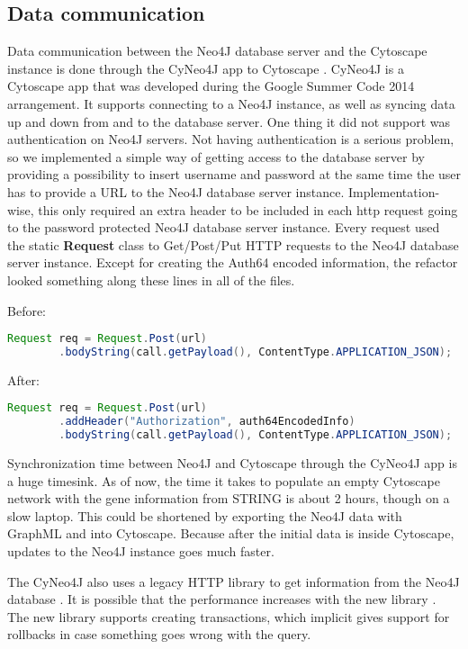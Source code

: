\subsection{Data communication}
Data communication between the Neo4J database server and the Cytoscape instance
is done through the CyNeo4J app to Cytoscape \cite{cyneo4j}. CyNeo4J is a
Cytoscape app that was developed during the Google Summer Code 2014 arrangement.
It supports connecting to a Neo4J instance, as well as syncing data up and down
from and to the database server. One thing it did not support was authentication
on Neo4J servers. Not having authentication is a serious problem, so we
implemented a simple way of getting access to the database server by providing a
possibility to insert username and password at the same time the user has to
provide a URL to the Neo4J database server instance. Implementation-wise, this
only required an extra header to be included in each http request going to the
password protected Neo4J database server instance. Every request used the static
\textbf{Request} class to Get/Post/Put HTTP requests to the Neo4J database
server instance. Except for creating the Auth64 encoded information, the
refactor looked something along these lines in all of the files.

Before:
\begin{lstlisting}[frame=single,language=Java]
Request req = Request.Post(url)
        .bodyString(call.getPayload(), ContentType.APPLICATION_JSON);
\end{lstlisting}

After:
\begin{lstlisting}[frame=single,language=Java]
Request req = Request.Post(url)
        .addHeader("Authorization", auth64EncodedInfo)
        .bodyString(call.getPayload(), ContentType.APPLICATION_JSON);
\end{lstlisting}

Synchronization time between Neo4J and Cytoscape through the CyNeo4J app is a
huge timesink. As of now, the time it takes to populate an empty Cytoscape
network with the gene information from STRING is about 2 hours, though on a slow
laptop. This could be shortened by exporting the Neo4J data with GraphML and
into Cytoscape. Because after the initial data is inside Cytoscape, updates to
the Neo4J instance goes much faster.

The CyNeo4J also uses a legacy HTTP library to get information from the Neo4J
database \cite{legacy-neo4j}. It is possible that the performance increases with
the new library \cite{transactional-neo4j}. The new library supports creating
transactions, which implicit gives support for rollbacks in case something goes
wrong with the query.

